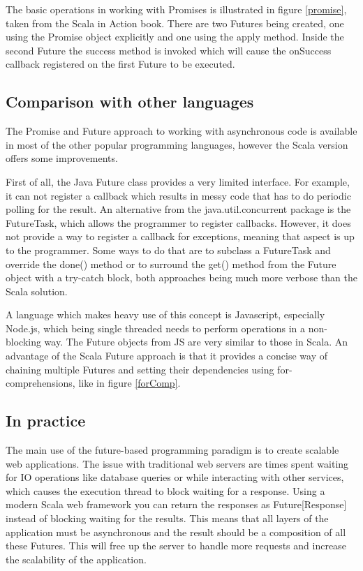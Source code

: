 \documentclass[12pt]{article}
\begin{document}
	The basic operations in working with Promises is illustrated in figure \ref{promise}, taken 
	from the Scala in Action book\cite{ScalaInAction}. There are two Futures being created, one 
	using the Promise object explicitly and one using the apply method. Inside the second 
	Future the success method is invoked which will cause the onSuccess callback registered 
	on the first Future to be executed.

	\subsection{Comparison with other languages}
	The Promise and Future approach to working with asynchronous code is available 
	in most of the other popular programming languages, however the Scala version 
	offers some improvements. 

	First of all, the Java Future class provides a very limited interface\cite{FutureJava}. For example, 
	it can not register a callback which results in messy code that has to do periodic polling 
	for the result. An alternative from the java.util.concurrent package is the FutureTask, which 
	allows the programmer to register callbacks. However, it does not provide a way to register 
	a callback for exceptions, meaning that aspect is up to the programmer. Some ways to do that are 
	to subclass a FutureTask and override the done() method or to surround the get() method from 
	the Future object with a try-catch block, both approaches being much more verbose than the Scala 
	solution.

	A language which makes heavy use of this concept is Javascript, especially Node.js, which being 
	single threaded needs to perform operations in a non-blocking way\cite{FutureJs}. The Future objects from 
	JS are very similar to those in Scala. An advantage of the Scala Future approach is that it 
	provides a concise way of chaining multiple Futures and setting their dependencies using 
	for-comprehensions, like in figure \ref{forComp}.

	\subsection{In practice}
	The main use of the future-based programming paradigm is to create scalable web applications\cite{FuturePromiseNeophyte}.
	The issue with traditional web servers are times spent waiting for IO operations like database 
	queries or while interacting with other services, which causes the execution thread to block 
	waiting for a response. Using a modern Scala web framework you can return the responses as Future[Response]
	instead of blocking waiting for the results. This means that all layers of the application must be 
	asynchronous and the result should be a composition of all these Futures. This will free up 
	the server to handle more requests and increase the scalability of the application.
\end{document}

